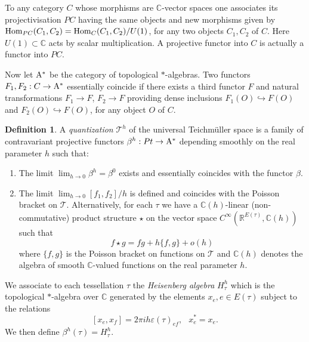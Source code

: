 \documentclass[twoside]{irmaems}
\theoremstyle{plain}
\theoremstyle{definition}
\newtheorem{definition}{Definition}[section]
\theoremstyle{remark}
\newcommand{\C}{{\mathbb{C}}}
\newcommand{\R}{{\mathbb{R}}}
\begin{document}
\vspace{0.2cm}
\noindent To any category $C$ whose morphisms are $\C$-vector spaces one 
associates its projectivisation $PC$ having the same objects and new 
morphisms given by ${\rm Hom}_{PC}(C_1,C_2)={\rm Hom}_C(C_1,C_2)/U(1)$, for any two objects 
$C_1,C_2$ of $C$. Here $U(1)\subset \C$ acts by scalar multiplication. 
A projective functor into $C$ is actually a functor into $PC$. 

\vspace{0.2cm}
\noindent 
Now let ${\rm A}^*$ be the category of topological $*$-algebras. 
Two functors $F_1, F_2:C\to {\rm A}^*$ essentially coincide if there exists a third functor $F$ and 
natural transformations $F_1\to F$, $F_2\to F$ providing dense inclusions 
$F_1(O)\hookrightarrow F(O)$ and $F_2(O)\hookrightarrow F(O)$, for any object $O$ of $C$. 


\begin{definition}\label{quant} 
A {\em quantization}  ${\mathcal T}^h$ of the universal Teichm\"uller space 
is a family of contravariant projective functors 
$\beta^h:Pt\to {\rm A}^*$ depending smoothly on the real parameter $h$ such that: 
\begin{enumerate}
\item The limit $\lim_{h\to 0} \beta^h= \beta^0$ exists and essentially 
coincides with the functor 
$\beta$. 
\item The limit $\lim_{h\to 0}[f_1,f_2]/h$ is defined and coincides with 
the Poisson bracket on ${\mathcal T}$. Alternatively, for each $\tau$ we have a 
$\C(h)$-linear (non-commutative) product structure $\star$ 
on the vector space $C^{\infty}(\R^{E(\tau)},\C(h))$ such that 
\[ f\star g= fg + h \{f,g\} + {o}(h)\]
where $\{f,g\}$ is the Poisson bracket on functions on ${\mathcal T}$ and 
$\C(h)$  denotes the algebra of smooth $\C$-valued functions on the real parameter $h$. 
\end{enumerate}
\end{definition}

\vspace{0.2cm}
\noindent 
We associate to each tessellation $\tau$ the {\em Heisenberg algebra}
 $H_{\tau}^h$ which is 
the topological $*$-algebra over $\C$ generated by the elements $x_e, e\in E(\tau)$ 
subject to the relations
\[ [x_e,x_f]=2\pi i h \varepsilon(\tau)_{ef}, \;\,\; x_e^*=x_e. \]
We then define  $\beta^h(\tau)=H_{\tau}^h$. 
\end{document}
